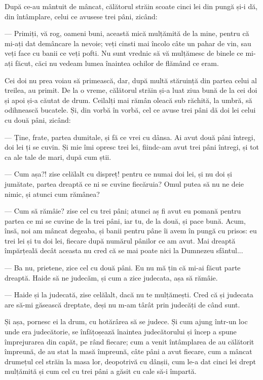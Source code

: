 \documentclass[12pt, a4paper, oneside, romanian]{teza-upb}
\begin{document}
După ce-au mântuit de mâncat, călătorul străin scoate cinci lei din pungă și-i dă, din întâmplare, celui ce avusese trei pâni, zicând:

— Primiți, vă rog, oameni buni, această mică mulțămită de la mine, pentru că mi-ați dat demâncare la nevoie; veți cinsti mai încolo câte un pahar de vin, sau veți face cu banii ce veți pofti. Nu sunt vrednic să vă mulțămesc de binele ce mi-ați făcut, căci nu vedeam lumea înaintea ochilor de flămând ce eram.

Cei doi nu prea voiau să primească, dar, după multă stăruință din partea celui al treilea, au primit. De la o vreme, călătorul străin și-a luat ziua bună de la cei doi și apoi și-a căutat de drum. Ceilalți mai rămân oleacă sub răchită, la umbră, să odihnească bucatele. Și, din vorbă în vorbă, cel ce avuse trei pâni dă doi lei celui cu două pâni, zicând:

— Ține, frate, partea dumitale, și fă ce vrei cu dânsa. Ai avut două pâni întregi, doi lei ți se cuvin. Și mie îmi opresc trei lei, fiindc-am avut trei pâni întregi, și tot ca ale tale de mari, după cum știi.

— Cum așa?! zise celălalt cu dispreț! pentru ce numai doi lei, și nu doi și jumătate, partea dreaptă ce ni se cuvine fiecăruia? Omul putea să nu ne deie nimic, și atunci cum rămânea?

— Cum să rămâie? zise cel cu trei pâni; atunci aș fi avut eu pomană pentru partea ce mi se cuvine de la trei pâni, iar tu, de la două, și pace bună. Acum, însă, noi am mâncat degeaba, și banii pentru pâne îi avem în pungă cu prisos: eu trei lei și tu doi lei, fiecare după numărul pânilor ce am avut. Mai dreaptă împărțeală decât aceasta nu cred că se mai poate nici la Dumnezeu sfântul...

— Ba nu, prietene, zice cel cu două pâni. Eu nu mă țin că mi-ai făcut parte dreaptă. Haide să ne judecăm, și cum a zice judecata, așa să rămâie.

— Haide și la judecată, zise celălalt, dacă nu te mulțămești. Cred că și judecata are să-mi găsească dreptate, deși nu m-am târât prin judecăți de când sunt.

Și așa, pornesc ei la drum, cu hotărârea să se judece. Și cum ajung într-un loc unde era judecătorie, se înfățoșează înaintea judecătorului și încep a spune împrejurarea din capăt, pe rând fiecare; cum a venit întâmplarea de au călătorit împreună, de au stat la masă împreună, câte pâni a avut fiecare, cum a mâncat drumețul cel străin la masa lor, deopotrivă cu dânșii, cum le-a dat cinci lei drept mulțămită și cum cel cu trei pâni a găsit cu cale să-i împartă.
\end{document}
